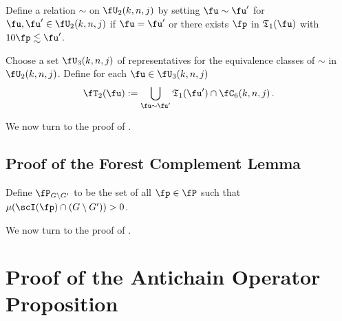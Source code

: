 Define a relation $\sim$ on $\fU_2(k,n,j)$
by setting $\fu\sim \fu'$
for $\fu,\fu'\in \fU_2(k,n,j)$
if $\fu=\fu'$ or there exists $\fp$ in $\mathfrak{T}_1(\fu)$
with $10 \fp\lesssim \fu'$.








Choose a set $\fU_3(k,n,j)$ of representatives for the equivalence
classes of $\sim$ in $\fU_2(k,n,j)$.
Define for each $\fu\in \fU_3(k,n,j)$
\begin{equation}\label{definesv}
\fT_2(\fu):=
   \bigcup_{\fu\sim \fu'}\mathfrak{T}_1(\fu')\cap \fC_6(k,n,j)\, .
\end{equation}

















We now turn to the proof of .


\subsection{Proof of the Forest Complement Lemma}
\label{subsecantichain}

Define $\fP_{G \setminus G'}$ to be the set of all $\fp \in \fP$ such that $\mu(\scI(\fp) \cap (G \setminus  G')) > 0$.












We now turn to the proof of .


\section{Proof of the Antichain Operator Proposition}


